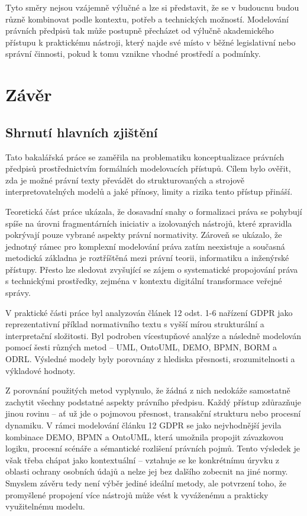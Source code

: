 Tyto směry nejsou vzájemně výlučné a lze si představit, že se v budoucnu budou různě kombinovat podle kontextu, potřeb a technických možností. Modelování právních předpisů tak může postupně přecházet od výlučně akademického přístupu k praktickému nástroji, který najde své místo v běžné legislativní nebo správní činnosti, pokud k tomu vznikne vhodné prostředí a podmínky.


\chapter{Závěr}
\label{sec:zakladni-zaver}

\section{Shrnutí hlavních zjištění}
\label{sec:shrnutí-zjisteni}

Tato bakalářská práce se zaměřila na problematiku konceptualizace právních předpisů prostřednictvím formálních modelovacích přístupů. Cílem bylo ověřit, zda je možné právní texty převádět do strukturovaných a strojově interpretovatelných modelů a jaké přínosy, limity a rizika tento přístup přináší.

Teoretická část práce ukázala, že dosavadní snahy o formalizaci práva se pohybují spíše na úrovni fragmentárních iniciativ a izolovaných nástrojů, které zpravidla pokrývají pouze vybrané aspekty právní normativity. Zároveň se ukázalo, že jednotný rámec pro komplexní modelování práva zatím neexistuje a současná metodická základna je roztříštěná mezi právní teorii, informatiku a inženýrské přístupy. Přesto lze sledovat zvyšující se zájem o systematické propojování práva s technickými prostředky, zejména v kontextu digitální transformace veřejné správy.

V praktické části práce byl analyzován článek 12 odst. 1-6 nařízení GDPR jako reprezentativní příklad normativního textu s vyšší mírou strukturální a interpretační složitosti. Byl podroben vícestupňové analýze a následně modelován pomocí šesti různých metod – UML, OntoUML, DEMO, BPMN, BORM a ODRL. Výsledné modely byly porovnány z hlediska přesnosti, srozumitelnosti a výkladové hodnoty.

Z porovnání použitých metod vyplynulo, že žádná z nich nedokáže samostatně zachytit všechny podstatné aspekty právního předpisu. Každý přístup zdůrazňuje jinou rovinu – ať už jde o pojmovou přesnost, transakční strukturu nebo procesní dynamiku. V rámci modelování článku 12 GDPR se jako nejvhodnější jevila kombinace DEMO, BPMN a OntoUML, která umožnila propojit závazkovou logiku, procesní scénáře a sémantické rozlišení právních pojmů. Tento výsledek je však třeba chápat jako kontextuální – vztahuje se ke konkrétnímu úryvku z oblasti ochrany osobních údajů a nelze jej bez dalšího zobecnit na jiné normy. Smyslem závěru tedy není výběr jediné ideální metody, ale potvrzení toho, že promyšlené propojení více nástrojů může vést k vyváženému a prakticky využitelnému modelu.

